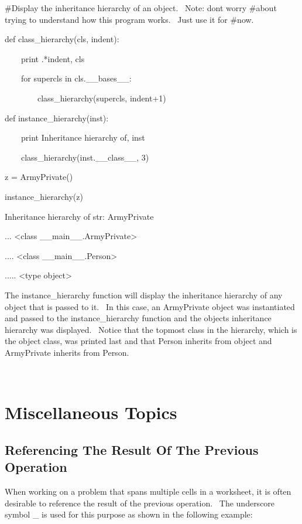 \documentclass[12pt,twoside]{book}
\begin{document}
\bigskip

\#Display the inheritance hierarchy of an object. \ Note:
don{\textquotesingle}t worry \#about trying to understand how this
program works. \ Just use it for \#now.

def class\_hierarchy(cls, indent):

\ \ \ \ print {\textquotesingle}.{\textquotesingle}*indent, cls

\ \ \ \ for supercls in cls.\_\_bases\_\_:

\ \ \ \ \ \ \ \ class\_hierarchy(supercls, indent+1)


\bigskip

def instance\_hierarchy(inst):

\ \ \ \ print {\textquotesingle}Inheritance hierarchy
of{\textquotesingle}, inst

\ \ \ \ class\_hierarchy(inst.\_\_class\_\_, 3)


\bigskip

z = ArmyPrivate()


\bigskip

instance\_hierarchy(z)

{\textbar}

Inheritance hierarchy of str: ArmyPrivate

... {\textless}class
{\textquotesingle}\_\_main\_\_.ArmyPrivate{\textquotesingle}{\textgreater}

.... {\textless}class
{\textquotesingle}\_\_main\_\_.Person{\textquotesingle}{\textgreater}

..... {\textless}type
{\textquotesingle}object{\textquotesingle}{\textgreater}

The instance\_hierarchy function will display the inheritance hierarchy
of any object that is passed to it. \ In this case, an ArmyPrivate
object was instantiated and passed to the instance\_hierarchy function
and the object{\textquotesingle}s inheritance hierarchy was displayed.
\ Notice that the topmost class in the hierarchy, which is the object
class, was printed last and that Person inherits from object and
ArmyPrivate inherits from Person.

\ 


\bigskip

\chapter[Miscellaneous Topics]{Miscellaneous Topics}
\section[Referencing The Result Of The Previous
Operation]{Referencing The Result Of The Previous Operation}
When working on a problem that spans multiple cells in a worksheet, it
is often desirable to reference the result of the previous operation.
\ The underscore symbol {\textquotesingle}\_{\textquotesingle} is used
for this purpose as shown in the following example:
\end{document}
